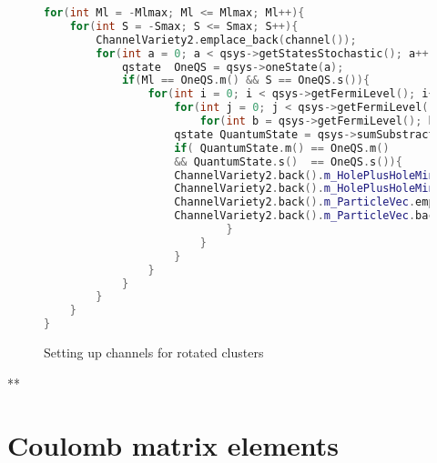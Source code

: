 \documentclass[twoside,english]{uiofysmaster}
\theoremstyle{definition}
\begin{document}
\begin{figure}
	\begin{lstlisting}[language=C++]
for(int Ml = -Mlmax; Ml <= Mlmax; Ml++){
   	for(int S = -Smax; S <= Smax; S++){
   		ChannelVariety2.emplace_back(channel());
   		for(int a = 0; a < qsys->getStatesStochastic(); a++){
   			qstate  OneQS = qsys->oneState(a);
   			if(Ml == OneQS.m() && S == OneQS.s()){
   				for(int i = 0; i < qsys->getFermiLevel(); i++){
   					for(int j = 0; j < qsys->getFermiLevel(); j++){
  						for(int b = qsys->getFermiLevel(); b < qsys->getStatesStochastic(); b++){
					qstate QuantumState = qsys->sumSubstractState(i,j,b);
					if( QuantumState.m() == OneQS.m()
					&& QuantumState.s()  == OneQS.s()){
					ChannelVariety2.back().m_HolePlusHoleMinusParticleVec.emplace_back(channelindexpair());
					ChannelVariety2.back().m_HolePlusHoleMinusParticleVec.back().setThree(i, j, b);
					ChannelVariety2.back().m_ParticleVec.emplace_back(channelindexpair());
					ChannelVariety2.back().m_ParticleVec.back().setOne(a);
  							}
   						}
   					}
   				}
   			}
   		}
   	}
}
\end{lstlisting}
\caption{Setting up channels for rotated clusters} \label{f:vectors_for_Q4}
\end{figure}


\clearpage
**\appendix
\chapter{Coulomb matrix elements}\label{app:1}




\printbibliography 
\end{document}
